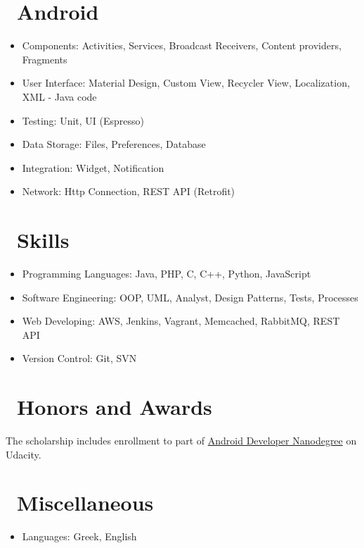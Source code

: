 \documentclass{resume}
\begin{document}

\section{\faAndroid\ Android}
\begin{itemize}[parsep=0.5ex]
  \item Components: Activities, Services, Broadcast Receivers, Content providers, Fragments
  \item User Interface: Material Design, Custom View, Recycler View, Localization, XML - Java code
  \item Testing: Unit, UI (Espresso)
  \item Data Storage: Files, Preferences, Database
  \item Integration: Widget, Notification
  \item Network: Http Connection, REST API (Retrofit)
\end{itemize}

\section{\faCogs\ Skills}
\begin{itemize}[parsep=0.5ex]
  \item Programming Languages: Java, PHP, C, C++, Python, JavaScript
  \item Software Engineering: OOP, UML, Analyst, Design Patterns, Tests, Processes
  \item Web Developing: AWS, Jenkins, Vagrant, Memcached, RabbitMQ, REST API
  \item Version Control: Git, SVN

\end{itemize}

\section{\faHeartO\ Honors and Awards}
The scholarship includes enrollment to part of \href{https://in.udacity.com/course/android-developer-nanodegree-by-google--nd801}{Android Developer Nanodegree} on Udacity. 

\section{\faInfo\ Miscellaneous}
\begin{itemize}[parsep=0.5ex]
  \item Languages: Greek, English
\end{itemize}

%
%
\end{document}
